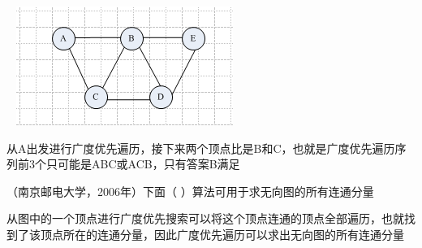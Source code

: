 ~
\includegraphics[width=2.78125in,height=1.52083in]{computerassets/1a724d66add415b16fa638eefae7110f.png}
\par{}
\begin{solution}从A出发进行广度优先遍历，接下来两个顶点比是B和C，也就是广度优先遍历序列前3个只可能是ABC或ACB，只有答案B满足
\end{solution}
\question （南京邮电大学，2006年）下面（ ）算法可用于求无向图的所有连通分量
\par{}
\begin{solution}从图中的一个顶点进行广度优先搜索可以将这个顶点连通的顶点全部遍历，也就找到了该顶点所在的连通分量，因此广度优先遍历可以求出无向图的所有连通分量
\end{solution}
